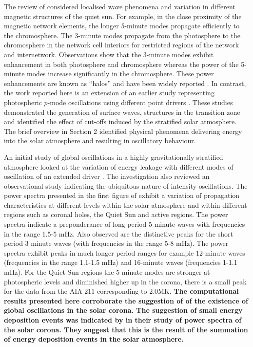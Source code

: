 \documentclass[physics,article,submit,pdftex,moreauthors]{Definitions/mdpi}
\begin{document}
The  review of \cite{Khomenko2013} considered localised wave phenomena and variation in different magnetic structures of the quiet sun. For example, in the close proximity of the magnetic network elements, the longer 5-minute modes propagate efficiently to the chromosphere. The 3-minute modes propagate from the photosphere to the chromosphere in the network cell interiors for restricted regions of the network and internetwork.  Observations show that the 3-minute modes exhibit enhancement in both photosphere and chromosphere whereas the power of the 5-minute modes increase significantly in the chromosphere. These power enhancements are known as “halos” and have been widely reported \cite{Kontogiannis2010}. 
In contrast, the work reported here is an extension of an earlier study representing photospheric $p$-mode oscillations using different point drivers  \cite{Malins2007}. These studies demonstrated  the generation of surface waves, structures in the transition zone and identified the effect of cut-offs induced by the stratified  solar atmosphere. The  brief overview in Section 2 identified physical phenomena delivering energy into the solar atmosphere and resulting in oscillatory behaviour. 

An initial study of global oscillations in a highly gravitationally stratified atmosphere looked at the variation of energy leakage with different modes of oscillation of an extended driver \cite{Griffiths2018b}. The investigation also reviewed an observational study indicating the ubiquitous nature of intensity oscillations. The power spectra presented in the first figure of \cite{Griffiths2018b} exhibit a variation of propagation characteristics at different levels within the solar atmosphere and within different regions such as coronal holes, the Quiet Sun and active regions. The power spectra indicate a preponderance of long period 5 minute waves with frequencies in the range 1.5-5 mHz. Also observed are the distinctive peaks for the short period 3 minute waves (with frequencies in the range 5-8 mHz). The power spectra exhibit  peaks in much longer period ranges for example 12-minute waves  (frequencies in the range 1.1-1.5 mHz)  and 16-minute waves (frequencies 1-1.1 mHz). For the Quiet Sun regions the 5 minute modes are stronger at photospheric levels and diminished higher up in the corona, there is a small peak for the data from the AIA 211 corresponding to 2.0MK. {\bf The computational results presented here corroborate the suggestion of \cite{Didkovsky2013} of the existence of global oscillations in the solar corona. The suggestion of small energy deposition events was indicated by \cite{Ireland2015} in their study of power spectra of the solar corona. They suggest that this is the result of the summation of energy deposition events in the solar atmosphere.} 
\end{document}
